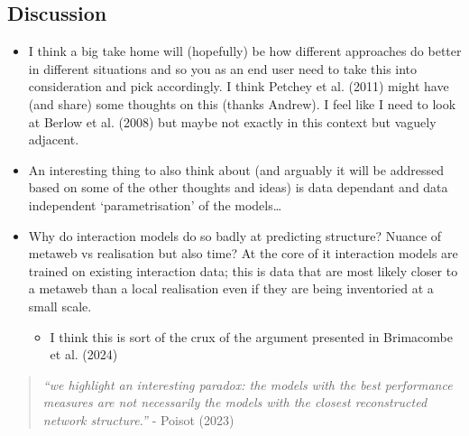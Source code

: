 \documentclass[
]{agujournal2019}
\providecommand{\tightlist}{%
  \setlength{\itemsep}{0pt}\setlength{\parskip}{0pt}}\usepackage{longtable,booktabs,array}
\begin{document}
\subsection{Discussion}\label{discussion}

\begin{itemize}
\item
  I think a big take home will (hopefully) be how different approaches
  do better in different situations and so you as an end user need to
  take this into consideration and pick accordingly. I think Petchey et
  al. (2011) might have (and share) some thoughts on this (thanks
  Andrew). I feel like I need to look at Berlow et al. (2008) but maybe
  not exactly in this context but vaguely adjacent.
\item
  An interesting thing to also think about (and arguably it will be
  addressed based on some of the other thoughts and ideas) is data
  dependant and data independent `parametrisation' of the models\ldots{}
\item
  Why do interaction models do so badly at predicting structure? Nuance
  of metaweb vs realisation but also time? At the core of it interaction
  models are trained on existing interaction data; this is data that are
  most likely closer to a metaweb than a local realisation even if they
  are being inventoried at a small scale.

  \begin{itemize}
  \tightlist
  \item
    I think this is sort of the crux of the argument presented in
    Brimacombe et al. (2024)
  \end{itemize}
\end{itemize}

\begin{quote}
\emph{``we highlight an interesting paradox: the models with the best
performance measures are not necessarily the models with the closest
reconstructed network structure.''} - Poisot (2023)
\end{quote}
\end{document}
